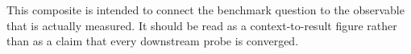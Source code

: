 This composite is intended to connect the benchmark question to the observable that is actually measured. It should be read as a context-to-result figure rather than as a claim that every downstream probe is converged.

